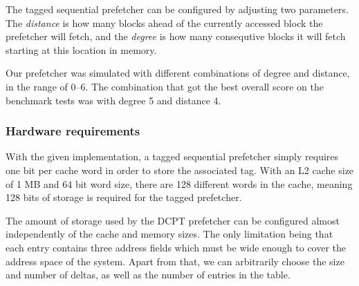 The tagged sequential prefetcher can be configured by adjusting two parameters.
The \emph{distance} is how many blocks ahead of the currently accessed block the
prefetcher will fetch, and the \emph{degree} is how many consequtive blocks it will
fetch starting at this location in memory.

Our prefetcher was simulated with different combinations of degree and distance,
in the range of 0--6. The combination that got the best overall score on the
benchmark tests was with degree 5 and distance 4.

\subsubsection{Hardware requirements}

With the given implementation, a tagged sequential prefetcher simply requires
one bit per cache word in order to store the associated tag. With an L2 cache
size of 1 MB and 64 bit word size, there are 128 different words in the cache,
meaning 128 bits of storage is required for the tagged prefetcher.

The amount of storage used by the DCPT prefetcher can be configured almost
independently of the cache and memory sizes. The only limitation being that each
entry contains three address fields which must be wide enough to cover the address
space of the system. Apart from that, we can arbitrarily choose the size and
number of deltas, as well as the number of entries in the table. 

